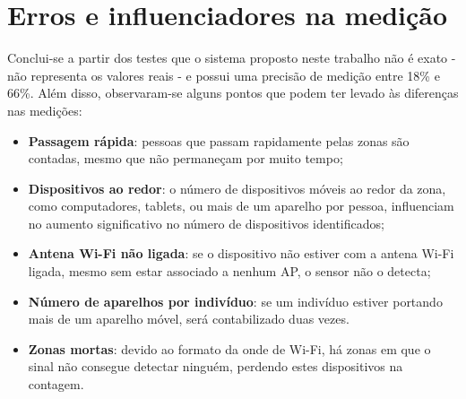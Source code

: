 \section{Erros e influenciadores na medição}
\label{erros-influencia}
Conclui-se a partir dos testes que o sistema proposto neste trabalho não é exato - não
representa os valores reais - e possui uma precisão de medição entre 18\% e
66\%. Além disso, observaram-se alguns pontos que podem ter levado às diferenças nas medições:
\begin{itemize}
    \item \textbf{Passagem rápida}: pessoas que passam rapidamente pelas zonas são contadas, mesmo que não
    permaneçam por muito tempo;
    \item \textbf{Dispositivos ao redor}: o número de dispositivos móveis ao redor da zona, como computadores, tablets,
    ou mais de um aparelho por pessoa, influenciam no aumento significativo no número de dispositivos identificados;
    \item \textbf{Antena Wi-Fi não ligada}: se o dispositivo não estiver com a antena Wi-Fi ligada, mesmo sem
    estar associado a nenhum AP, o sensor não o detecta;
    \item \textbf{Número de aparelhos por indivíduo}: se um indivíduo estiver portando mais de um aparelho
    móvel, será contabilizado duas vezes.
    \item \textbf{Zonas mortas}: devido ao formato da onde de Wi-Fi, há zonas em que o sinal não consegue
    detectar ninguém, perdendo estes dispositivos na contagem.
\end{itemize}
